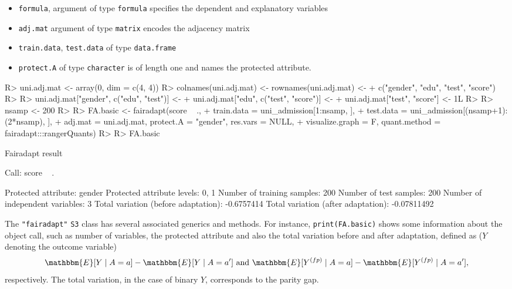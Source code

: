 \documentclass[
  notitle]{jss}
\providecommand{\tightlist}{%
  \setlength{\itemsep}{0pt}\setlength{\parskip}{0pt}}
\begin{document}
\begin{itemize}
\tightlist
\item
  \texttt{formula}, argument of type \texttt{formula} specifies the
  dependent and explanatory variables
\item
  \texttt{adj.mat} argument of type \texttt{matrix} encodes the
  adjacency matrix
\item
  \texttt{train.data}, \texttt{test.data} of type \texttt{data.frame}
\item
  \texttt{protect.A} of type \texttt{character} is of length one and
  names the protected attribute.
\end{itemize}

\begin{CodeChunk}
\begin{CodeInput}
R> uni.adj.mat <- array(0, dim = c(4, 4))
R> colnames(uni.adj.mat) <- rownames(uni.adj.mat) <-
+   c("gender", "edu", "test", "score")
R> 
R> uni.adj.mat["gender", c("edu", "test")] <-
+   uni.adj.mat["edu", c("test", "score")] <-
+   uni.adj.mat["test", "score"] <- 1L
R> 
R> nsamp <- 200
R> 
R> FA.basic <- fairadapt(score ~ .,
+   train.data = uni_admission[1:nsamp, ],
+   test.data = uni_admission[(nsamp+1):(2*nsamp), ],
+   adj.mat = uni.adj.mat, protect.A = "gender", res.vars = NULL,
+   visualize.graph = F, quant.method = fairadapt:::rangerQuants)
R> 
R> FA.basic
\end{CodeInput}
\begin{CodeOutput}
Fairadapt result

Call:
 score ~ . 

Protected attribute:                  gender 
Protected attribute levels:           0, 1 
Number of training samples:           200 
Number of test samples:               200 
Number of independent variables:      3 
Total variation (before adaptation):  -0.6757414 
Total variation (after adaptation):   -0.07811492 
\end{CodeOutput}
\end{CodeChunk}

The \texttt{"fairadapt"} \texttt{S3} class has several associated
generics and methods. For instance, \texttt{print(FA.basic)} shows some
information about the object call, such as number of variables, the
protected attribute and also the total variation before and after
adaptation, defined as (\(Y\) denoting the outcome variable)
\[\mathbbm{E}[Y \mid A = a] - \mathbbm{E}[Y \mid A = a'] \text{ and } \mathbbm{E}[ {Y}^{(fp)} \mid A = a] - \mathbbm{E}[ {Y}^{(fp)} \mid A = a'],\]
respectively. The total variation, in the case of binary \(Y\),
corresponds to the parity gap.
\end{document}

